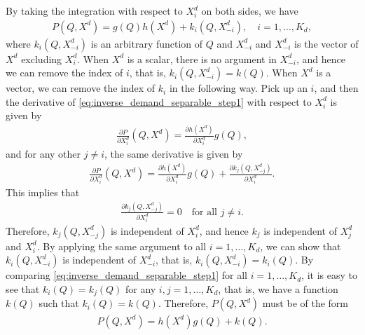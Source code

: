 \documentclass[11pt, a4paper]{article}
\theoremstyle{remark}
\begin{document}
By taking the integration with respect to $X^{d}_i$ on both sides, we have
\begin{align}
   P(Q, X^{d}) = g(Q) h(X^{d}) + k_i(Q, X^{d}_{-i}), \quad i = 1, \ldots, K_d, \label{eq:inverse_demand_separable_step1}
\end{align}
where $k_i(Q, X^{d}_{-i})$ is an arbitrary function of $Q$ and $X^{d}_{-i}$ and $X^{d}_{-i}$ is the vector of $X^{d}$ excluding $X^{d}_i$.
When $X^{d}$ is a scalar, there is no argument in $X^{d}_{-i}$, and hence we can remove the index of $i$, that is, $k_i(Q, X^{d}_{-i}) = k(Q)$.
When $X^{d}$ is a vector, we can remove the index of $k_i$ in the following way.
Pick up an $i$, and then the derivative of \eqref{eq:inverse_demand_separable_step1} with respect to $X^{d}_i$ is given by
\begin{align}
    \frac{\partial P}{\partial X^{d}_i}(Q, X^{d}) = \frac{\partial h(X^{d})}{\partial X^{d}_i} g(Q),
\end{align}
and for any other $j \ne i$, the same derivative is given by
\begin{align}
    \frac{\partial P}{\partial X^{d}_i}(Q, X^{d}) = \frac{\partial h(X^{d})}{\partial X^{d}_i} g(Q) + \frac{\partial k_j(Q, X^{d}_{-j})}{\partial X^{d}_i}.
\end{align}
This implies that
\begin{align}
    \frac{\partial k_j(Q, X^{d}_{-j})}{\partial X^{d}_i} = 0 \quad \text{for all } j \ne i.
\end{align}
Therefore, $k_j(Q, X^{d}_{-j})$ is independent of $X^{d}_i$, and hence $k_j$ is independent of $X^{d}_j$ and $X^{d}_i$.
By applying the same argument to all $i = 1, \ldots, K_d$, we can show that $k_i(Q, X^{d}_{-i})$ is independent of $X^{d}_{-i}$, that is, $k_i(Q, X^{d}_{-i}) = k_i(Q)$.
By comparing \eqref{eq:inverse_demand_separable_step1} for all $i = 1, \ldots, K_d$, it is easy to see that $k_i(Q) = k_j(Q)$ for any $i,j = 1, \ldots, K_d$, that is, we have a function $k(Q)$ such that $k_i(Q) = k(Q)$.
Therefore, $P(Q, X^{d})$ must be of the form
\begin{align}
    P(Q, X^{d}) = h(X^{d})g(Q) + k(Q).
\end{align}
\end{document}
